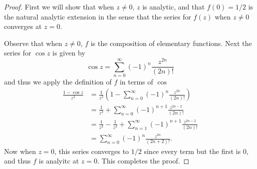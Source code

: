 \documentclass[11pt]{amsart}
\theoremstyle{definition}
\numberwithin{theorem}{section}
\numberwithin{definition}{section}
\numberwithin{equation}{section}
\begin{document}
\begin{proof}
	First we will show that when $z \neq 0$, $z$ is analytic, and that $f(0) = 1/2$ is 
	the natural analytic extension in the sense that the series for $f(z)$ when $z \neq 0$
	converges at $z = 0.$

	Observe that when $z \neq 0$, $f$ is the composition of elementary functions. Next
	the series for $\cos z$ is given by
	\begin{equation*}
		\cos z = \sum_{n=0}^\infty (-1)^n \frac{z^{2n}}{(2n)!}
	\end{equation*}
	and thus we apply the definition of $f$ in terms of $\cos$
	\begin{equation*}
	\begin{aligned}
		\frac{1- \cos z}{z^2} &= \frac{1}{z^2}\left(1 - \sum_{n=0}^\infty (-1)^n \frac{z^{2n}}{(2n)!}\right) \\
		&= \frac{1}{z^2} + \sum_{n=0}^\infty (-1)^{n+1} \frac{z^{2n-2}}{(2n)!} \\
		&= \frac{1}{z^2} - \frac{1}{z^2} + \sum_{n=1}^\infty (-1)^{n+1} \frac{z^{2n-2}}{(2n)!} \\
		&= \sum_{n=0}^\infty (-1)^{n} \frac{z^{2n}}{(2n+2)!}.
	\end{aligned}
	\end{equation*}
	Now when $z = 0$, this series converges to $1/2$ since every term but the first is $0$, and thus $f$ is analyitc at $z = 0.$
	This completes the proof.
\end{proof}	
\end{document}
